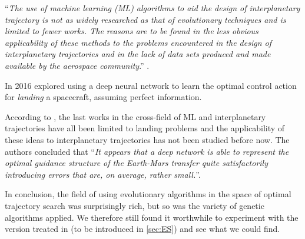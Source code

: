 ``\textit{The use of machine learning (ML) algorithms to aid the design of interplanetary trajectory is not as widely researched as that of evolutionary techniques and is limited to fewer works. The reasons are to be found in the less obvious applicability of these methods to the problems encountered in the design of interplanetary trajectories and in the lack of data sets produced and made available by the aerospace community}.'' \cite{Izzo2018}.

In 2016 \cite{Sanchez-Sanchez2016} explored using a deep neural network to learn the optimal control action for \emph{landing} a spacecraft, assuming perfect information. 

According to \cite{Izzo2018}, the last works in the cross-field of ML and interplanetary trajectories have all been limited to landing problems and the applicability of these ideas to interplanetary trajectories has not been studied before now. The authors concluded that ``\textit{It appears that a deep network is able to represent the optimal guidance structure of the Earth-Mars transfer quite satisfactorily introducing errors that are, on average, rather small.}''.

In conclusion, the field of using evolutionary algorithms in the space of optimal trajectory search was surprisingly rich, but so was the variety of genetic algorithms applied. We therefore still found it worthwhile to experiment with the version treated in \cite{Salimans2017} (to be introduced in \cref{sec:ES}) and see what we could find.